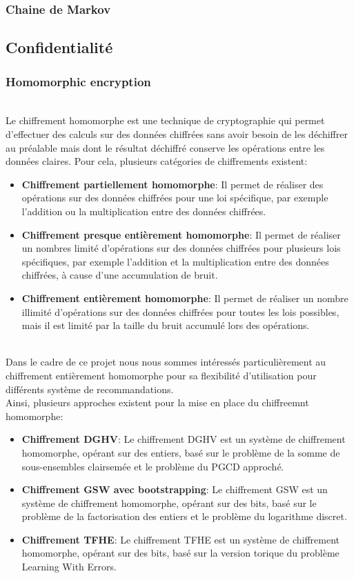 \documentclass{article}
\begin{document}
\subsubsection{Chaine de Markov}
\subsection{Confidentialité}
\subsubsection{Homomorphic encryption}
$ $\\
Le chiffrement homomorphe est une technique de cryptographie qui permet d'effectuer des calculs sur des données chiffrées sans avoir besoin de les déchiffrer au préalable mais dont le résultat déchiffré conserve les opérations entre les données claires.
Pour cela, plusieurs catégories de chiffrements existent:\\
\begin{itemize}
    \item \textbf{Chiffrement partiellement homomorphe}: Il permet de réaliser des opérations sur des données chiffrées pour une loi spécifique, par exemple l'addition ou la multiplication entre des données chiffrées.
    \item \textbf{Chiffrement presque entièrement homomorphe}: Il permet de réaliser un nombres limité d'opérations sur des données chiffrées pour plusieurs lois spécifiques, par exemple l'addition et la multiplication entre des données chiffrées, à cause d'une accumulation de bruit.
    \item \textbf{Chiffrement entièrement homomorphe}: Il permet de réaliser un nombre illimité d'opérations sur des données chiffrées pour toutes les lois possibles, mais il est limité par la taille du bruit accumulé lors des opérations.
\end{itemize}
$ $\\
Dans le cadre de ce projet nous nous sommes intéressés particulièrement au chiffrement entièrement homomorphe pour sa flexibilité d'utilisation pour différents système de recommandations.\\
Ainsi, plusieurs approches existent pour la mise en place du chiffreemnt homomorphe: \\
\begin{itemize}
    \item \textbf{Chiffrement DGHV}: Le chiffrement DGHV est un système de chiffrement homomorphe, opérant sur des entiers, basé sur le problème de la somme de sous-ensembles clairsemée et le problème du PGCD approché.
    \item \textbf{Chiffrement GSW avec bootstrapping}: Le chiffrement GSW est un système de chiffrement homomorphe, opérant sur des bits, basé sur le problème de la factorisation des entiers et le problème du logarithme discret.
    \item \textbf{Chiffrement TFHE}: Le chiffrement TFHE est un système de chiffrement homomorphe, opérant sur des bits, basé sur la version torique du problème Learning With Errors.
\end{itemize}
\end{document}
